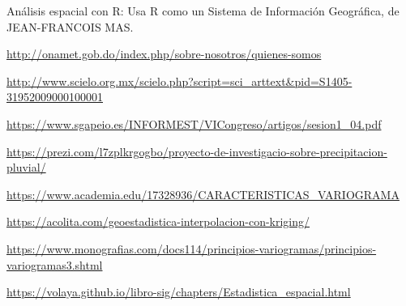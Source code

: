 \documentclass[11pt,]{article}
\begin{document}
Análisis espacial con R: Usa R como un Sistema de Información
Geográfica, de JEAN-FRANCOIS MAS.

\url{http://onamet.gob.do/index.php/sobre-nosotros/quienes-somos}

\url{http://www.scielo.org.mx/scielo.php?script=sci_arttext\&pid=S1405-31952009000100001}

\url{https://www.sgapeio.es/INFORMEST/VICongreso/artigos/sesion1_04.pdf}

\url{https://prezi.com/l7zplkrgogbo/proyecto-de-investigacio-sobre-precipitacion-pluvial/}

\url{https://www.academia.edu/17328936/CARACTERISTICAS_VARIOGRAMA}

\url{https://acolita.com/geoestadistica-interpolacion-con-kriging/}

\url{https://www.monografias.com/docs114/principios-variogramas/principios-variogramas3.shtml}

\url{https://volaya.github.io/libro-sig/chapters/Estadistica_espacial.html}




\newpage
\singlespacing 
\end{document}
